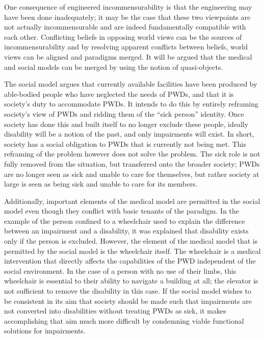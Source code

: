 \documentclass[a4paper]{article}
\begin{document}
One consequence of engineered incommensurability is that the engineering may
have been done inadequately; it may be the case that these two viewpoints are
not actually incommensurable and are indeed fundamentally compatible with each
other. Conflicting beliefs in opposing world views can be the sources of
incommensurability and by resolving apparent conflicts between beliefs, world
views can be aligned and paradigms merged. It will be argued that the medical
and social models can be merged by using the notion of quasi-objects.

The social model argues that currently available facilities have been produced
by able-bodied people who have neglected the needs of PWDs, and that it is
society's duty to accommodate PWDs. It intends to do this by entirely
reframing society's view of PWDs and ridding them of the ``sick person''
identity. Once society has done this and built itself to no longer exclude
these people, ideally disability will be a notion of the past, and only
impairments will exist. In short, society has a social obligation to PWDs that
is currently not being met. This reframing of the problem however does not
solve the problem. The sick role is not fully removed from the situation, but
transferred onto the broader society; PWDs are no longer seen as sick and
unable to care for themselves, but rather society at large is seen as being
sick and unable to care for its members.

Additionally, important elements of the medical model are permitted in the
social model even though they conflict with basic tenants of the paradigm. In
the example of the person confined to a wheelchair used to explain the
difference between an impairment and a disability, it was explained that
disability exists only if the person is excluded. However, the element of the
medical model that is permitted by the social model is the wheelchair itself.
The wheelchair is a medical intervention that directly affects the
capabilities of the PWD independent of the social environment. In the case of
a person with no use of their limbs, this wheelchair is essential to their
ability to navigate a building at all; the elevator is not sufficient to
remove the disability in this case. If the social model wishes to be
consistent in its aim that society should be made such that impairments are
not converted into disabilities without treating PWDs as sick, it makes
accomplishing that aim much more difficult by condemning viable functional
solutions for impairments.
\end{document}
